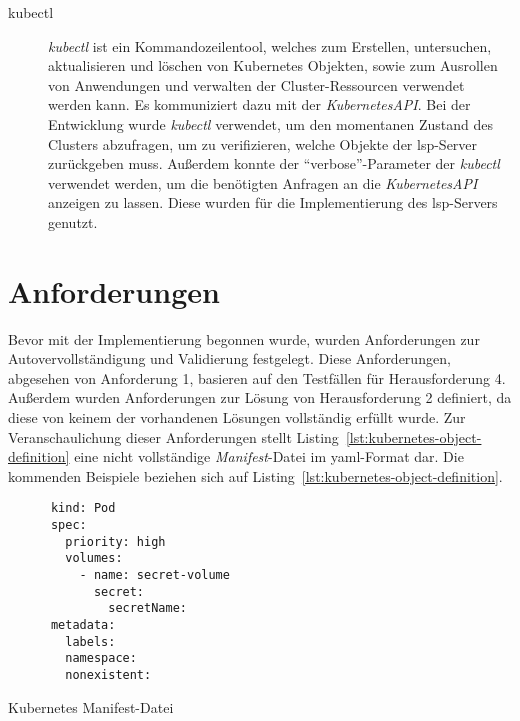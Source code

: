 \begin{description}
  \item[kubectl]
        \textit{kubectl} ist ein Kommandozeilentool, welches zum Erstellen, untersuchen, aktualisieren und löschen von Kubernetes Objekten, sowie zum Ausrollen
        von Anwendungen und verwalten der Cluster-Ressourcen verwendet werden kann. Es kommuniziert dazu mit der \textit{KubernetesAPI}.\@
        Bei der Entwicklung wurde \textit{kubectl} verwendet, um den momentanen Zustand des Clusters abzufragen,
        um zu verifizieren, welche Objekte der \ac{lsp}-Server zurückgeben muss.
        Außerdem konnte der ``verbose''-Parameter der \textit{kubectl} verwendet werden, um die benötigten Anfragen an die \textit{KubernetesAPI} anzeigen zu lassen.
        Diese wurden für die Implementierung des \ac{lsp}-Servers genutzt.
\end{description}

\section{Anforderungen}\label{sec:requirements}

Bevor mit der Implementierung begonnen wurde, wurden Anforderungen zur Autovervollständigung und Validierung festgelegt.
Diese Anforderungen, abgesehen von Anforderung 1, basieren auf den Testfällen für Herausforderung 4. Außerdem wurden Anforderungen zur Lösung von Herausforderung 2 definiert,
da diese von keinem der vorhandenen Lösungen vollständig erfüllt wurde.
Zur Veranschaulichung dieser Anforderungen stellt Listing~\ref{lst:kubernetes-object-definition} eine nicht vollständige \textit{Manifest}-Datei im \ac{yaml}-Format dar.
Die kommenden Beispiele beziehen sich auf Listing~\ref{lst:kubernetes-object-definition}.

\begin{listing}[htp]
  \begin{verbatim}
      kind: Pod
      spec: 
        priority: high
        volumes: 
          - name: secret-volume
            secret: 
              secretName: 
      metadata: 
        labels: 
        namespace:
        nonexistent:
      \end{verbatim}
  \caption{Kubernetes Manifest-Datei}
  \label{lst:kubernetes-object-definition}
\end{listing}

